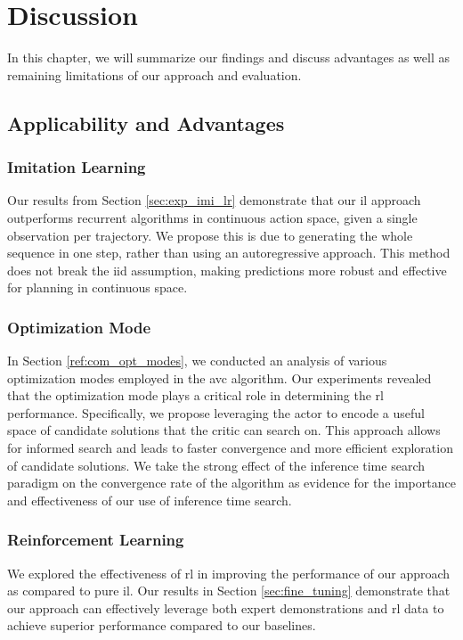 
\chapter{Discussion}
\label{chapter:Discussion}
In this chapter, we will summarize our findings and discuss advantages as well as remaining limitations of our approach and evaluation.
\section{Applicability and Advantages}
\subsection{Imitation Learning}
Our results from Section \ref{sec:exp_imi_lr} demonstrate that our \ac{il} approach outperforms recurrent algorithms in continuous action space, 
given a single observation per trajectory. We propose this is due to generating the whole sequence in one step, 
rather than using an autoregressive approach. This method does not break the \ac{iid} assumption, making predictions more robust and effective 
for planning in continuous space. 

\subsection{Optimization Mode}
In Section \ref{ref:com_opt_modes}, we conducted an analysis of various optimization modes employed in the \ac{avc} algorithm. 
Our experiments revealed that the optimization mode plays a critical role in determining the \ac{rl} performance. 
Specifically, we propose leveraging the actor to encode a useful space of candidate solutions that the critic can search on. 
This approach allows for informed search and leads to faster convergence and more efficient exploration of candidate solutions. We take the strong effect of the inference time 
search paradigm on the convergence rate of the algorithm as evidence for the importance and effectiveness of our use of inference time search.

\subsection{Reinforcement Learning}
We explored the effectiveness of \ac{rl} in improving the performance of our approach as compared to pure \ac{il}. 
Our results in Section \ref{sec:fine_tuning} demonstrate that our approach can effectively leverage both expert demonstrations and \ac{rl} data to achieve 
superior performance compared to our baselines.

